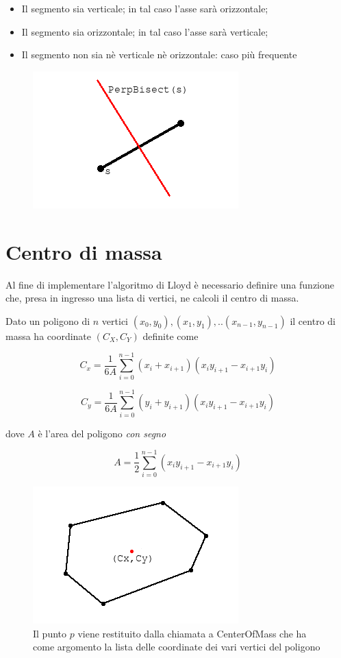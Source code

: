 \documentclass[11pt,a4paper]{report}
\newcommand{\modelicaclass}[1]{
	
}
\newcommand{\name}[1]{{\ttfamily #1}}
\begin{document}
\begin{itemize}
	\item Il segmento sia verticale; in tal caso l'asse sarà orizzontale;
	\item Il segmento sia orizzontale; in tal caso l'asse sarà verticale;
	\item Il segmento non sia nè verticale nè orizzontale: caso più frequente
\end{itemize}

\begin{figure}[H]
\centering
\includegraphics[scale=0.7]{PerpendicularBisector.png}
\end{figure}

\modelicaclass{PerpendicularBisector.mo}

\section{Centro di massa}

Al fine di implementare l'algoritmo di Lloyd è necessario definire una funzione che, presa in ingresso una lista di vertici, ne calcoli il centro di massa.

Dato un poligono di $n$ vertici $(x_0, y_0), (x_1, y_1), ..(x_{n-1},y_{n-1})$ il centro di massa ha coordinate $(C_X, C_Y)$ definite come

\[
C_x = \frac{1}{6 A} \sum_{i=0}^{n-1} (x_i + x_{i+1}) (x_i y_{i+1} - x_{i+1} y_i)
\]

\[
C_y = \frac{1}{6 A} \sum_{i=0}^{n-1} (y_i + y_{i+1}) (x_i y_{i+1} - x_{i+1} y_i)
\]

dove $A$ è l'area del poligono \textit{con segno}

\[
A = \frac{1}{2} \sum_{i=0}^{n-1} (x_i y_{i+1} - x_{i+1} y_i)
\]

\begin{figure}[H]
\centering
\includegraphics[scale=0.6]{CenterOfMass.png}
\caption{Il punto $p$ viene restituito dalla chiamata a \name{CenterOfMass} che ha come argomento la lista delle coordinate dei vari vertici del poligono}
\end{figure}
\end{document}
